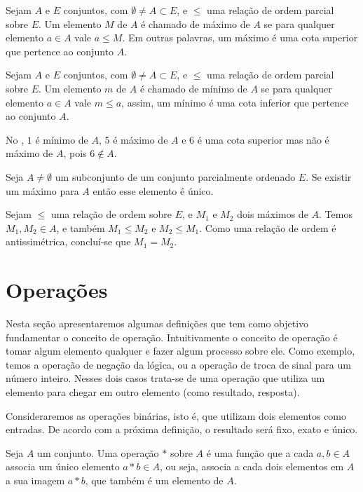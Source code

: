 \documentclass[../main.tex]{subfiles}
\begin{document}
\begin{defi}\label{agb-def-maximo}
     Sejam $A$ e $E$ conjuntos, com $\emptyset \neq A \subset E$, e $\leq$ uma relação de ordem parcial sobre $E$. Um elemento $M$ de $A$ é chamado de máximo de $A$ se para qualquer elemento $a \in A$ vale $a \leq M$. Em outras palavras, um máximo é uma cota superior que pertence ao conjunto $A$.   
\end{defi}
\begin{defi}\label{agb-def-minimo}
     Sejam $A$ e $E$ conjuntos, com $\emptyset \neq A \subset E$, e $\leq$ uma relação de ordem parcial sobre $E$. Um elemento $m$ de $A$ é chamado de mínimo de $A$ se para qualquer elemento $a \in A$ vale $m \leq a$, assim, um mínimo é uma cota inferior que pertence ao conjunto $A$.   
\end{defi}
\begin{ex}
    No , $1$ é mínimo de $A$, $5$ é máximo de $A$ e $6$ é uma cota superior mas não é máximo de $A$, pois $6 \not\in A$.
\end{ex}

\begin{teo}\label{agb-teo-maximoUnico}
    Seja $A \neq \emptyset$ um subconjunto de um conjunto parcialmente ordenado $E$. Se existir um máximo para $A$ então esse elemento é único.
\end{teo} 
\begin{dem}
    Sejam $\leq$ uma relação de ordem sobre $E$, e $M_1$ e $M_2$ dois máximos de $A$. Temos $M_1, M_2 \in A$, e também $M_1 \leq M_2$  e $M_2 \leq M_1$. Como uma relação de ordem é antissimétrica, concluí-se que $M_1 = M_2$.
\end{dem}


\section{Operações}

Nesta seção apresentaremos algumas definições que tem como objetivo fundamentar o conceito de operação. Intuitivamente o conceito de operação é tomar algum elemento qualquer e fazer algum processo sobre ele. Como exemplo, temos a operação de negação da lógica, ou a operação de troca de sinal para um número inteiro. Nesses dois casos trata-se de uma operação que utiliza um elemento para chegar em outro elemento (como resultado, resposta).

Consideraremos as operações binárias, isto é, que utilizam dois elementos como entradas. De acordo com a próxima definição, o resultado será fixo, exato e único.
\begin{defi}\label{agb-def-operacao}
    Seja $A$ um conjunto. Uma operação $*$ sobre $A$ é uma função que a cada $a,b \in A$ associa um único elemento $a * b \in A$, ou seja, associa a cada dois elementos em $A$ a sua imagem $a * b$, que também é um elemento de $A$.
\end{defi}
\end{document}

